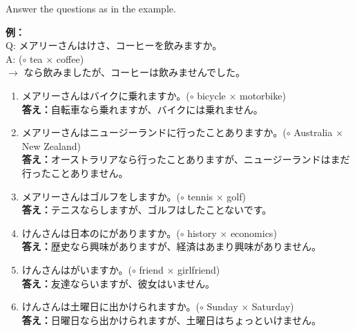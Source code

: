 \documentclass[notoc,notitlepage]{tufte-book}
\begin{document}
\begin{ex}
  Answer the questions as in the example.

  \textbf{例：} \\
  \noindent Q: メアリーさんはけさ、コーヒーを飲みますか。\\
  \noindent A: ($\circ$ tea $\times$ coffee) \\
  \noindent \quad\enspace $\to$ なら飲みましたが、コーヒーは飲みませんでした。

  \begin{enumerate}
    \item メアリーさんはバイクに乗れますか。($\circ$ bicycle $\times$ motorbike) \\
      \textbf{答え：}自転車なら乗れますが、バイクには乗れません。 
    \item メアリーさんはニュージーランドに行ったことありますか。($\circ$ Australia $\times$ New Zealand) \\
      \textbf{答え：}オーストラリアなら行ったことありますが、ニュージーランドはまだ行ったことありません。 
    \item メアリーさんはゴルフをしますか。($\circ$ tennis $\times$ golf) \\
      \textbf{答え：}テニスならしますが、ゴルフはしたことないです。
    \item けんさんは日本のにがありますか。($\circ$ history $\times$ economics) \\
      \textbf{答え：}歴史なら興味がありますが、経済はあまり興味がありません。 
    \item けんさんはがいますか。($\circ$ friend $\times$ girlfriend) \\
      \textbf{答え：}友達ならいますが、彼女はいません。 
    \item けんさんは土曜日に出かけられますか。($\circ$ Sunday $\times$ Saturday) \\
      \textbf{答え：}日曜日なら出かけられますが、土曜日はちょっといけません。 
  \end{enumerate}
\end{ex}
\end{document}
